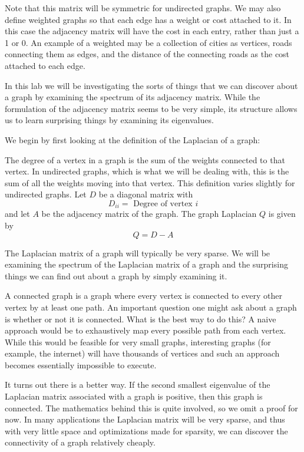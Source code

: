 Note that this matrix will be symmetric for undirected graphs.
We may also define weighted graphs so that each edge has a weight or cost attached to it.
In this case the adjacency matrix will have the cost in each entry, rather than just a 1 or 0.
An example of a weighted may be a collection of cities as vertices, roads connecting them as edges, and the distance of the connecting roads as the cost attached to each edge.

In this lab we will be investigating the sorts of things that we can discover about a graph by examining the spectrum of its  adjacency matrix.
While the formulation of the adjacency matrix seems to be very simple, its structure allows us to learn surprising things by examining its eigenvalues.  

We begin by first looking at the definition of the Laplacian of a graph:

\begin{definition}  The degree of a vertex in a graph is the sum of the weights connected to that vertex.
In undirected graphs, which is what we will be dealing with, this is the sum of all the weights moving into that vertex.
This definition varies slightly for undirected graphs.
Let $D$ be a diagonal matrix with
\[
D_{ii} = \mbox{ Degree of vertex $i$}
\]
and let $A$ be the adjacency matrix of the graph.
The graph Laplacian $Q$ is given by
\[
Q = D-A
\]
\end{definition}

The Laplacian matrix of a graph will typically be very sparse.
We will be examining the spectrum of the Laplacian matrix of a graph and the surprising things we can find out about a graph by simply examining it.    

A connected graph is a graph where every vertex is connected to every other vertex by at least one path.
An important question one might ask about a graph is whether or not it is connected.
What is the best way to do this?
A naive approach would be to exhaustively map every possible path from each vertex.
While this would be feasible for very small graphs, interesting graphs (for example, the internet) will have thousands of vertices and such an approach becomes essentially impossible to execute.

It turns out there is a better way.
If the second smallest eigenvalue of the Laplacian matrix associated with a graph is positive, then this graph is connected.
The mathematics behind this is quite involved, so we omit a proof for now.
In many applications the Laplacian matrix will be very sparse, and thus with very little space and optimizations made for sparsity, we can discover the connectivity of a graph relatively cheaply.

